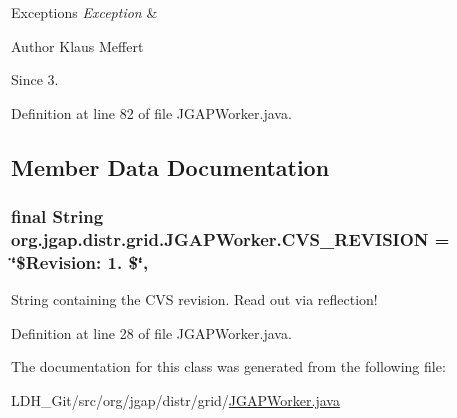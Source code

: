 \begin{DoxyExceptions}{Exceptions}
{\em Exception} & \\
\hline
\end{DoxyExceptions}
\begin{DoxyAuthor}{Author}
Klaus Meffert 
\end{DoxyAuthor}
\begin{DoxySince}{Since}
3. 
\end{DoxySince}


Definition at line 82 of file J\-G\-A\-P\-Worker.\-java.



\subsection{Member Data Documentation}
\hypertarget{classorg_1_1jgap_1_1distr_1_1grid_1_1_j_g_a_p_worker_a9d0a0879ef16cc99b608329d09b5c1fb}{
\subsubsection[{C\-V\-S\-\_\-\-R\-E\-V\-I\-S\-I\-O\-N}]{\setlength{\rightskip}{0pt plus 5cm}final String org.\-jgap.\-distr.\-grid.\-J\-G\-A\-P\-Worker.\-C\-V\-S\-\_\-\-R\-E\-V\-I\-S\-I\-O\-N = \char`\"{}\$Revision\-: 1. \$\char`\"{}\hspace{0.3cm}{\ttfamily [static]}, {\ttfamily [private]}}}\label{classorg_1_1jgap_1_1distr_1_1grid_1_1_j_g_a_p_worker_a9d0a0879ef16cc99b608329d09b5c1fb}
String containing the C\-V\-S revision. Read out via reflection! 

Definition at line 28 of file J\-G\-A\-P\-Worker.\-java.



The documentation for this class was generated from the following file\-:\begin{DoxyCompactItemize}
\item 
L\-D\-H\-\_\-\-Git/src/org/jgap/distr/grid/\hyperlink{_j_g_a_p_worker_8java}{J\-G\-A\-P\-Worker.\-java}\end{DoxyCompactItemize}

